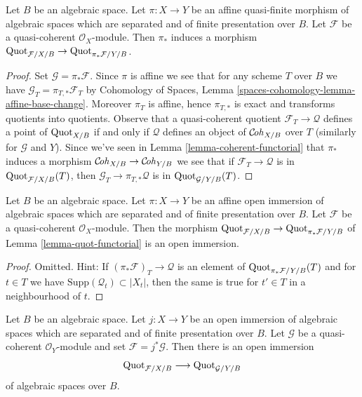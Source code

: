\begin{lemma}
\label{lemma-quot-functorial}
Let $B$ be an algebraic space. Let $\pi : X \to Y$ be an affine quasi-finite
morphism of algebraic spaces which are separated and of finite presentation
over $B$. Let $\mathcal{F}$ be a quasi-coherent $\mathcal{O}_X$-module.
Then $\pi_*$ induces a morphism
$\mathrm{Quot}_{\mathcal{F}/X/B} \to \mathrm{Quot}_{\pi_*\mathcal{F}/Y/B}$.
\end{lemma}

\begin{proof}
Set $\mathcal{G} = \pi_*\mathcal{F}$. Since $\pi$ is affine we see that for
any scheme $T$ over $B$ we have $\mathcal{G}_T = \pi_{T, *}\mathcal{F}_T$ by
Cohomology of Spaces, Lemma \ref{spaces-cohomology-lemma-affine-base-change}.
Moreover $\pi_T$ is affine, hence $\pi_{T, *}$ is exact and transforms
quotients into quotients. Observe that a quasi-coherent quotient
$\mathcal{F}_T \to \mathcal{Q}$ defines a point of $\mathrm{Quot}_{X/B}$
if and only if $\mathcal{Q}$ defines an object of $\mathcal{C}\!\mathit{oh}_{X/B}$
over $T$ (similarly for $\mathcal{G}$ and $Y$). Since we've seen in
Lemma \ref{lemma-coherent-functorial}
that $\pi_*$ induces a morphism $\mathcal{C}\!\mathit{oh}_{X/B} \to \mathcal{C}\!\mathit{oh}_{Y/B}$
we see that if $\mathcal{F}_T \to \mathcal{Q}$ is in
$\mathrm{Quot}_{\mathcal{F}/X/B}(T)$, then
$\mathcal{G}_T \to \pi_{T, *}\mathcal{Q}$ is
in $\mathrm{Quot}_{\mathcal{G}/Y/B}(T)$.
\end{proof}

\begin{lemma}
\label{lemma-quot-open}
Let $B$ be an algebraic space. Let $\pi : X \to Y$ be an affine open immersion
of algebraic spaces which are separated and of finite presentation over $B$.
Let $\mathcal{F}$ be a quasi-coherent $\mathcal{O}_X$-module. Then the morphism
$\mathrm{Quot}_{\mathcal{F}/X/B} \to \mathrm{Quot}_{\pi_*\mathcal{F}/Y/B}$ of
Lemma \ref{lemma-quot-functorial} is an open immersion.
\end{lemma}

\begin{proof}
Omitted. Hint: If $(\pi_*\mathcal{F})_T \to \mathcal{Q}$ is an element of
$\mathrm{Quot}_{\pi_*\mathcal{F}/Y/B}(T)$
and for $t \in T$ we have $\text{Supp}(\mathcal{Q}_t) \subset |X_t|$,
then the same is true for $t' \in T$ in a neighbourhood of $t$.
\end{proof}

\begin{lemma}
\label{lemma-quot-better-open}
Let $B$ be an algebraic space. Let $j : X \to Y$ be an open immersion
of algebraic spaces which are separated and of finite presentation over $B$.
Let $\mathcal{G}$ be a quasi-coherent $\mathcal{O}_Y$-module and set
$\mathcal{F} = j^*\mathcal{G}$. Then there is an open immersion
$$
\mathrm{Quot}_{\mathcal{F}/X/B}
\longrightarrow
\mathrm{Quot}_{\mathcal{G}/Y/B}
$$
of algebraic spaces over $B$.
\end{lemma}

